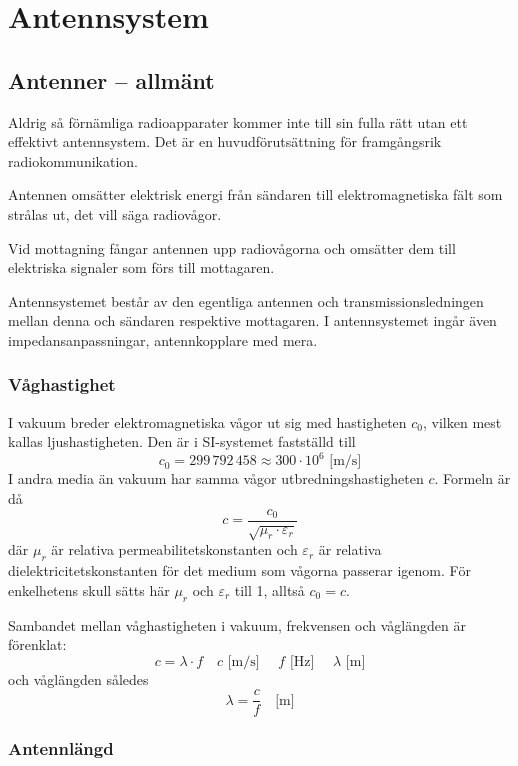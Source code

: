 \chapter{Antennsystem}

\section{Antenner -- allmänt}

Aldrig så förnämliga radioapparater kommer inte till sin fulla rätt utan ett
effektivt antennsystem.
Det är en huvudförutsättning för framgångsrik radiokommunikation.

Antennen omsätter elektrisk energi från sändaren till elektromagnetiska fält
som strålas ut, det vill säga radiovågor.

Vid mottagning fångar antennen upp radiovågorna och omsätter dem till
elektriska signaler som förs till mottagaren.

Antennsystemet består av den egentliga antennen och transmissionsledningen
mellan denna och sändaren respektive mottagaren.
I antennsystemet ingår även impedansanpassningar, antennkopplare med mera.

\subsection{Våghastighet}
\label{ljushastigheten}

I vakuum breder elektromagnetiska vågor ut sig med hastigheten \(c_0\), vilken
mest kallas ljushastigheten.
Den är i SI-systemet \cite{SIbrochure8} fastställd till
\[c_0 = 299\,792\,458 \approx 300 \cdot 10^6 \text{ [m/s]}\]
I andra media än vakuum har samma vågor utbredningshastigheten \(c\).
Formeln är då
\[c = \frac{c_0}{\sqrt{\mu_r \cdot \varepsilon_r}}\]
där \(\mu_r\) är relativa permeabilitetskonstanten och \(\varepsilon_r\) är
relativa dielektricitetskonstanten för det medium som vågorna passerar igenom.
För enkelhetens skull sätts här \(\mu_r\) och \(\varepsilon_r\) till 1,
alltså \(c_0 = c\).

Sambandet mellan våghastigheten i vakuum, frekvensen och våglängden är förenklat:
\[ c = \lambda \cdot f \quad c\text{ [m/s] }\quad f\text{ [Hz] } \quad \lambda\text{ [m]}\]
och våglängden således
\[ \lambda = \frac{c}{f} \quad \text{[m]} \]

\subsection{Antennlängd}

